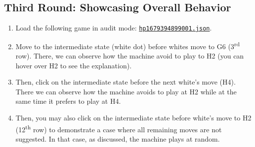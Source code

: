\documentclass[a4paper,11pt]{article}
\theoremstyle{definition}
\theoremstyle{remark}
\numberwithin{equation}{section}
\begin{document}
	\subsection{Third Round: Showcasing Overall Behavior}\label{subsec:Third Round}
	\begin{enumerate}
		\item Load the following game in audit mode: \href{../games/hp_50_14_1679394899001.json}{\texttt{hp\textunderscore 1679394899001.json}}.
		\item Move to the intermediate state (white dot) before whites move to G6 (3\textsuperscript{rd} row). There, we can observe how the machine avoid to play to H2 (you can hover over H2 to see the explanation).
		\item Then, click on the intermediate state before the next white's move (H4). There we can observe how the machine avoids to play at H2 while at the same time it prefers to play at H4.
		\item Then, you may also click on the intermediate state before white's move to H2 (12\textsuperscript{th} row) to demonstrate a case where all remaining moves are not suggested. In that case, as discussed, the machine plays at random.
	\end{enumerate}
\end{document}
